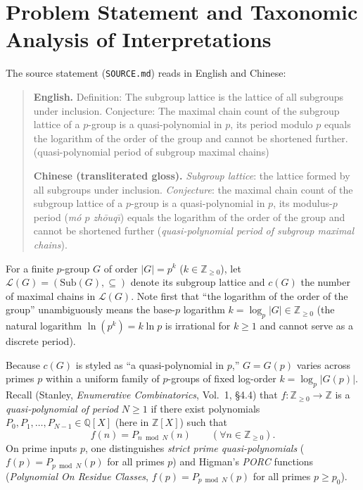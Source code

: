 \documentclass[11pt,a4paper]{article}
\theoremstyle{definition}
\newcommand{\Sub}{\mathrm{Sub}}
\begin{document}
\section{Problem Statement and Taxonomic Analysis of Interpretations}

The source statement (\texttt{SOURCE.md}) reads in English and Chinese:
\begin{quote}
\textbf{English.} Definition: The subgroup lattice is the lattice of all subgroups under inclusion. Conjecture: The maximal chain count of the subgroup lattice of a $p$-group is a quasi-polynomial in $p$, its period modulo $p$ equals the logarithm of the order of the group and cannot be shortened further. (quasi-polynomial period of subgroup maximal chains)

\medskip
\noindent\textbf{Chinese (transliterated gloss).} \emph{Subgroup lattice}: the lattice formed by all subgroups under inclusion. \emph{Conjecture}: the maximal chain count of the subgroup lattice of a $p$-group is a quasi-polynomial in $p$, its modulus-$p$ period (\emph{m\'o $p$ zh\=ouq\=\i}) equals the logarithm of the order of the group and cannot be shortened further (\emph{quasi-polynomial period of subgroup maximal chains}).
\end{quote}

For a finite $p$-group $G$ of order $|G| = p^k$ ($k \in \mathbb{Z}_{\ge 0}$), let $\mathcal{L}(G) = (\Sub(G), \subseteq)$ denote its subgroup lattice and $c(G)$ the number of maximal chains in $\mathcal{L}(G)$. Note first that ``the logarithm of the order of the group'' unambiguously means the base-$p$ logarithm $k = \log_p |G| \in \mathbb{Z}_{\ge 0}$ (the natural logarithm $\ln(p^k) = k \ln p$ is irrational for $k \ge 1$ and cannot serve as a discrete period).

Because $c(G)$ is styled as ``a quasi-polynomial in $p$,'' $G = G(p)$ varies across primes $p$ within a uniform family of $p$-groups of fixed log-order $k = \log_p |G(p)|$. Recall (Stanley, \emph{Enumerative Combinatorics}, Vol.~1, \S4.4) that $f : \mathbb{Z}_{\ge 0} \to \mathbb{Z}$ is a \emph{quasi-polynomial of period $N \ge 1$} if there exist polynomials $P_0, P_1, \dots, P_{N-1} \in \mathbb{Q}[X]$ (here in $\mathbb{Z}[X]$) such that
\begin{equation}\label{eq:quasipoly}
  f(n) = P_{n \bmod N}(n) \qquad (\forall n \in \mathbb{Z}_{\ge 0}).
\end{equation}
On prime inputs $p$, one distinguishes \emph{strict prime quasi-polynomials} ($f(p) = P_{p \bmod N}(p)$ for all primes $p$) and Higman's \emph{PORC} functions (\emph{Polynomial On Residue Classes}, $f(p) = P_{p \bmod N}(p)$ for all primes $p \ge p_0$).
\end{document}
